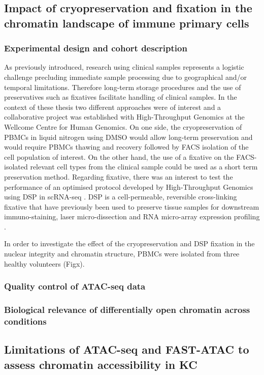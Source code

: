 \subsection{Impact of cryopreservation and fixation in the chromatin landscape of immune primary cells}
\subsubsection{Experimental design and cohort description}
As previously introduced, research using clinical samples represents a logistic challenge precluding immediate sample processing due to geographical and/or temporal limitations. Therefore long-term storage procedures and the use of preservatives such as fixatives facilitate handling of clinical samples. In the context of these thesis two different approaches were of interest and a collaborative project was established with High-Throughput Genomics at the Wellcome Centre for Human Genomics. On one side, the cryopreservation of PBMCs in liquid nitrogen using DMSO would allow long-term preservation and would require PBMCs thawing and recovery followed by FACS isolation of the cell population of interest. On the other hand, the use of a fixative on the FACS-isolated relevant cell types from the clinical sample could be used as a short term preservation method. Regarding fixative, there was an interest to test the performance of an optimised protocol developed by High-Throughput Genomics using DSP in scRNA-seq \parencite{}. DSP is a cell-permeable, reversible cross-linking fixative that have previously been used to preserve tissue samples for downstream immuno-staining, laser micro-dissection and RNA micro-array expression profiling \parencite{}.

In order to investigate the effect of the cryopreservation and DSP fixation in the nuclear integrity and chromatin structure, PBMCs were isolated from three healthy volunteers (Figx).


\subsubsection{Quality control of ATAC-seq data}
\subsubsection{Biological relevance of differentially open chromatin across conditions}




\subsection{Limitations of ATAC-seq and FAST-ATAC to assess chromatin accessibility in KC}

